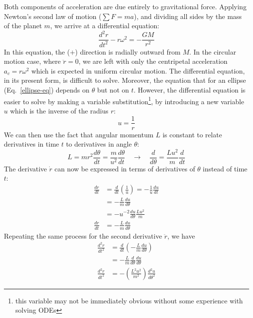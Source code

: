 \documentclass[11pt]{article}
\begin{document}
Both components of acceleration are due entirely to gravitational force.
Applying Newton's second law of motion ($\sum F=ma$), and dividing all sides by
the mass of the planet $m$, we arrive at a differential equation:
\begin{equation}
  \frac{d^2r}{dt^2}-r\omega^2=-\frac{GM}{r^2}
  \label{ode1}
\end{equation}
In this equation, the ($+$) direction is radially outward from $M$. In the
circular motion case, where $\ddot{r}=0$, we are left with only the centripetal
acceleration
$a_c=r\omega^2$ which is expected in uniform circular motion. The differential
equation, in its present form, is difficult to solve. Moreover, the equation
that for an ellipse (Eq.~\ref{ellipse-eq}) depends on $\theta$ but not on $t$.
However, the
differential equation is easier to solve by making a variable
substitution\footnote{this variable may not be immediately obvious without
  some experience with solving ODEs}, by introducing a new variable $u$ which
is the inverse of the radius $r$:
\begin{equation}
  u=\frac{1}{r}
\end{equation}
We can then use the fact that angular momentum $L$ is constant to relate
derivatives in time $t$ to derivatives in angle $\theta$:
\begin{equation}
  L=mr^2\frac{d\theta}{dt}=\frac{m}{u^2}\frac{d\theta}{dt}
  \quad\longrightarrow\quad
  \frac{d}{d\theta}=\frac{Lu^2}{m}\frac{d}{dt}
\end{equation}
The derivative $\dot{r}$ can now be expressed in terms of derivatives of
$\theta$ instead of time $t$:
\begin{align}
  \nonumber
  \frac{dr}{dt} &=\frac{d}{dt}\left(\frac{1}{u}\right)
  =-\frac{1}{u}\frac{du}{dt}\\
  \nonumber
  &=-\frac{L}{m}\frac{du}{d\theta}\\
  \nonumber
  &= -u^{-2}\frac{du}{d\theta} \frac{Lu^2}{m} \\
  \frac{dr}{dt}&= -\frac{L}{m}\frac{du}{d\theta}
\end{align}
Repeating the same process for the second derivative $\ddot{r}$, we have
\begin{align}
  \nonumber
  \frac{d^2r}{dt^2} &= \frac{d}{dt}\left(-\frac{L}{m}\frac{du}{d\theta}\right)\\
  \nonumber
  &= -\frac{L}{m} \frac{d}{d\theta}\frac{du}{d\theta} \\
  \frac{d^2r}{dt^2}&= -\left(\frac{L^2u^2}{m^2}\right)\frac{d^2u}{d\theta^2}
\end{align}
\end{document}
